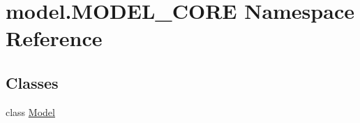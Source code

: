 \hypertarget{namespacemodel_1_1MODEL__CORE}{}\section{model.\+M\+O\+D\+E\+L\+\_\+\+C\+O\+R\+E Namespace Reference}
\label{namespacemodel_1_1MODEL__CORE}
\subsection*{Classes}
\begin{DoxyCompactItemize}
\item 
class \hyperlink{classmodel_1_1MODEL__CORE_1_1Model}{Model}
\end{DoxyCompactItemize}

